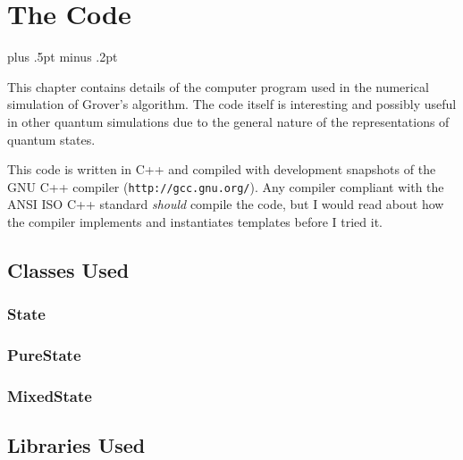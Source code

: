

\chapter{The Code}
\label{chap:code}

\baselineskip=15.5pt plus .5pt minus .2pt

This chapter contains details of the computer program used
in the numerical simulation of Grover's algorithm.
The code itself is interesting and possibly useful in
other quantum simulations due to the general nature of the
representations of quantum states.

This code is written in C++ and compiled with development
snapshots of the GNU C++ compiler (\texttt{http://gcc.gnu.org/}).
Any compiler compliant with the ANSI ISO C++ standard \emph{should}
compile the code, but I would read about how the compiler implements
and instantiates templates before I tried it.


\section{Classes Used}

\subsection{State}
\subsection{PureState}
\subsection{MixedState}
\label{ssec:mixedstate}


\section{Libraries Used}

